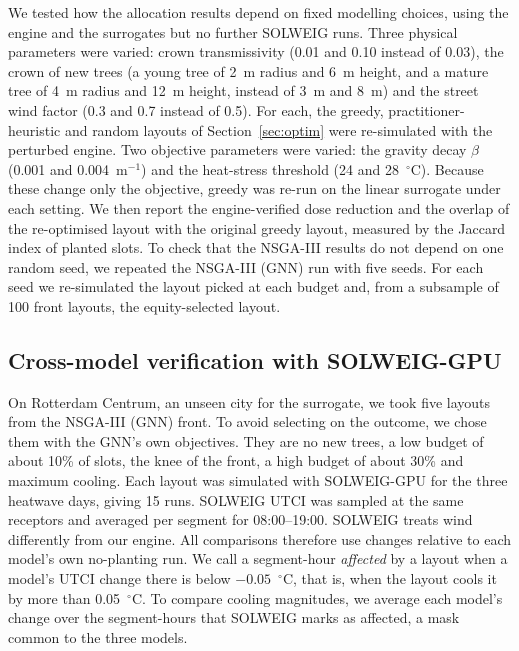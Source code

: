 \documentclass[preprint,12pt,authoryear]{elsarticle}
\newcommand{\degC}{\ensuremath{^\circ}C}
\begin{document}
We tested how the allocation results depend on fixed modelling choices, using the engine and the surrogates but no further SOLWEIG runs. Three physical parameters were varied: crown transmissivity (0.01 and 0.10 instead of 0.03), the crown of new trees (a young tree of 2~m radius and 6~m height, and a mature tree of 4~m radius and 12~m height, instead of 3~m and 8~m) and the street wind factor (0.3 and 0.7 instead of 0.5). For each, the greedy, practitioner-heuristic and random layouts of Section~\ref{sec:optim} were re-simulated with the perturbed engine. Two objective parameters were varied: the gravity decay $\beta$ (0.001 and 0.004~m$^{-1}$) and the heat-stress threshold (24 and 28~\degC). Because these change only the objective, greedy was re-run on the linear surrogate under each setting. We then report the engine-verified dose reduction and the overlap of the re-optimised layout with the original greedy layout, measured by the Jaccard index of planted slots. To check that the NSGA-III results do not depend on one random seed, we repeated the NSGA-III (GNN) run with five seeds. For each seed we re-simulated the layout picked at each budget and, from a subsample of 100 front layouts, the equity-selected layout.

\subsection{Cross-model verification with SOLWEIG-GPU}\label{sec:verify}

On Rotterdam Centrum, an unseen city for the surrogate, we took five layouts from the NSGA-III (GNN) front. To avoid selecting on the outcome, we chose them with the GNN's own objectives. They are no new trees, a low budget of about 10\% of slots, the knee of the front, a high budget of about 30\% and maximum cooling. Each layout was simulated with SOLWEIG-GPU for the three heatwave days, giving 15 runs. SOLWEIG UTCI was sampled at the same receptors and averaged per segment for 08:00--19:00. SOLWEIG treats wind differently from our engine. All comparisons therefore use changes relative to each model's own no-planting run. We call a segment-hour \emph{affected} by a layout when a model's UTCI change there is below $-0.05$~\degC, that is, when the layout cools it by more than 0.05~\degC. To compare cooling magnitudes, we average each model's change over the segment-hours that SOLWEIG marks as affected, a mask common to the three models.

\end{document}
